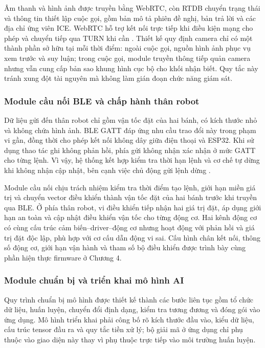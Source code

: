 Âm thanh và hình ảnh được truyền bằng WebRTC, còn RTDB chuyển trạng thái và thông tin thiết lập cuộc gọi, gồm bản mô tả phiên đề nghị, bản trả lời và các địa chỉ ứng viên ICE. WebRTC hỗ trợ kết nối trực tiếp khi điều kiện mạng cho phép và chuyển tiếp qua TURN khi cần . Thiết kế quy định camera chỉ có một thành phần sở hữu tại mỗi thời điểm: ngoài cuộc gọi, nguồn hình ảnh phục vụ xem trước và suy luận; trong cuộc gọi, module truyền thông tiếp quản camera nhưng vẫn cung cấp bản sao khung hình cục bộ cho khối nhận biết. Quy tắc này tránh xung đột tài nguyên mà không làm gián đoạn chức năng giám sát.

\subsubsection{Module cầu nối BLE và chấp hành thân robot}

Dữ liệu gửi đến thân robot chỉ gồm vận tốc đặt của hai bánh, có kích thước nhỏ và không chứa hình ảnh. BLE GATT đáp ứng nhu cầu trao đổi này trong phạm vi gần, đồng thời cho phép kết nối không dây giữa điện thoại và ESP32. Khi sử dụng thao tác ghi không phản hồi, phía gửi không nhận xác nhận ở mức GATT cho từng lệnh. Vì vậy, hệ thống kết hợp kiểm tra thời hạn lệnh và cơ chế tự dừng khi không nhận cập nhật, bên cạnh việc chủ động gửi lệnh dừng .

Module cầu nối chịu trách nhiệm kiểm tra thời điểm tạo lệnh, giới hạn miền giá trị và chuyển vector điều khiển thành vận tốc đặt của hai bánh trước khi truyền qua BLE. Ở phía thân robot, vi điều khiển tiếp nhận hai giá trị đặt, áp dụng giới hạn an toàn và cập nhật điều khiển vận tốc cho từng động cơ. Hai kênh động cơ có cùng cấu trúc cảm biến--driver--động cơ nhưng hoạt động với phản hồi và giá trị đặt độc lập, phù hợp với cơ cấu dẫn động vi sai. Cấu hình chân kết nối, thông số động cơ, giới hạn vận hành và tham số bộ điều khiển được trình bày cùng phần hiện thực firmware ở Chương 4.

\subsubsection{Module chuẩn bị và triển khai mô hình AI}

Quy trình chuẩn bị mô hình được thiết kế thành các bước liên tục gồm tổ chức dữ liệu, huấn luyện, chuyển đổi định dạng, kiểm tra tương đương và đóng gói vào ứng dụng. Mô hình triển khai phải công bố rõ kích thước đầu vào, kiểu dữ liệu, cấu trúc tensor đầu ra và quy tắc tiền xử lý; bộ giải mã ở ứng dụng chỉ phụ thuộc vào giao diện này thay vì phụ thuộc trực tiếp vào môi trường huấn luyện.

